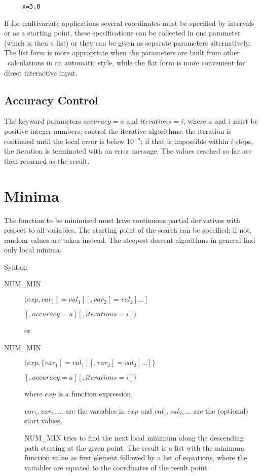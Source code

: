 \begin{verbatim}
     x=3.0
\end{verbatim}

If for multivariate applications several coordinates must be
specified by intervals or as a starting point, these
specifications can be collected in one parameter (which is then
a list) or they can be given as separate parameters
alternatively.  The list form is more appropriate when the
parameters are built from other \REDUCE\ calculations in an
automatic style, while the flat form is more convenient
for direct interactive input.

\subsection{Accuracy Control}

The keyword parameters $accuracy=a$ and $iterations=i$, where
$a$ and $i$ must be positive integer numbers, control the
iterative algorithms: the iteration is continued until
the local error is below $10^{-a}$; if that is impossible
within $i$ steps, the iteration is terminated with an
error message.  The values reached so far are then returned
as the result.

\section{Minima}

The function to be minimised must have continuous partial derivatives
with respect to all variables.  The starting point of the search can
be specified; if not, random values are taken instead.  The steepest
descent algorithms in general find only local minima.

Syntax:

\begin{description}
\item[NUM\_MIN] $(exp, var_1[=val_1] [,var_2[=val_2] \ldots]$

$             [,accuracy=a][,iterations=i]) $

or

\item[NUM\_MIN] $(exp, \{ var_1[=val_1] [,var_2[=val_2] \ldots] \}$

$             [,accuracy=a][,iterations=i]) $

where $exp$ is a function expression,

$var_1, var_2, \ldots$ are the variables in $exp$ and
$val_1,val_2, \ldots$ are the (optional) start values.

NUM\_MIN tries to find the next local minimum along the descending
path starting at the given point. The result is a list
with the minimum function value as first element followed by a list
of equations, where the variables are equated to the coordinates
of the result point.
\end{description}

